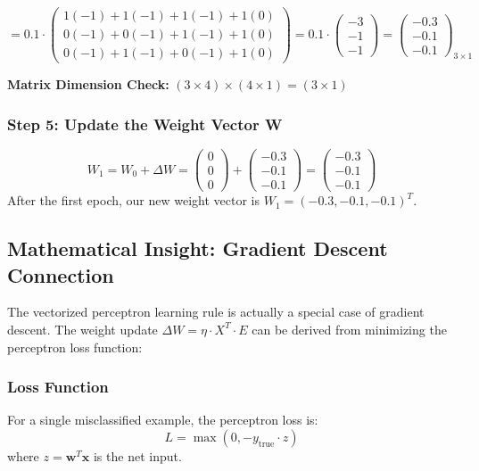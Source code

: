 \[
= 0.1 \cdot \begin{pmatrix}
1(-1) + 1(-1) + 1(-1) + 1(0) \\
0(-1) + 0(-1) + 1(-1) + 1(0) \\
0(-1) + 1(-1) + 0(-1) + 1(0)
\end{pmatrix} = 0.1 \cdot \begin{pmatrix}
-3 \\
-1 \\
-1
\end{pmatrix} = \begin{pmatrix}
-0.3 \\
-0.1 \\
-0.1
\end{pmatrix}_{3 \times 1}
\]

\textbf{Matrix Dimension Check:} \((3 \times 4) \times (4 \times 1) = (3 \times 1)\) 

\subsubsection{Step 5: Update the Weight Vector W}
\[
W_1 = W_0 + \Delta W =
\begin{pmatrix}
0 \\
0 \\
0
\end{pmatrix}
+
\begin{pmatrix}
-0.3 \\
-0.1 \\
-0.1
\end{pmatrix}
=
\begin{pmatrix}
-0.3 \\
-0.1 \\
-0.1
\end{pmatrix}
\]
After the first epoch, our new weight vector is \(W_1 = (-0.3, -0.1, -0.1)^T\).

\subsection{Mathematical Insight: Gradient Descent Connection}
The vectorized perceptron learning rule is actually a special case of gradient descent. The weight update \(\Delta W = \eta \cdot X^T \cdot E\) can be derived from minimizing the perceptron loss function:

\subsubsection{Loss Function}
For a single misclassified example, the perceptron loss is:
\[L = \max(0, -y_{\text{true}} \cdot z)\]
where \(z = \mathbf{w}^T \mathbf{x}\) is the net input.

